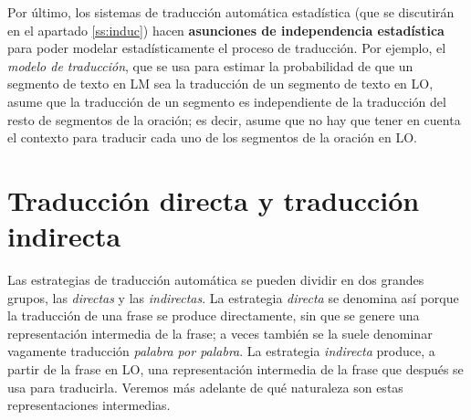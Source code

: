 Por último, los sistemas de traducción automática estadística (que se discutirán en el apartado \ref{ss:induc}) hacen \textbf{asunciones de independencia estadística} para poder modelar estadísticamente el proceso de traducción. Por ejemplo, el \emph{modelo de traducción}, que se usa para estimar la probabilidad de que un segmento de texto en LM sea la traducción de un segmento de texto en LO, asume que la traducción de un segmento es independiente de la traducción del resto de segmentos de la oración; es decir, asume que no hay que tener en cuenta el contexto para traducir cada uno de los segmentos de la oración en LO. 

\section{Traducción directa y traducción indirecta} \label{ss:dirindir} Las estrategias de traducción automática se pueden dividir en dos grandes grupos, las \emph{directas} y las \emph{indirectas}. La estrategia \emph{directa} se denomina así porque la traducción de una frase se produce directamente, sin que se genere una representación intermedia de la frase; a veces también se la suele denominar vagamente traducción \emph{palabra por palabra}. La estrategia \emph{indirecta} produce, a partir de la frase en LO, una representación intermedia de la frase que después se usa para traducirla. Veremos más adelante de qué naturaleza son estas representaciones intermedias. 

